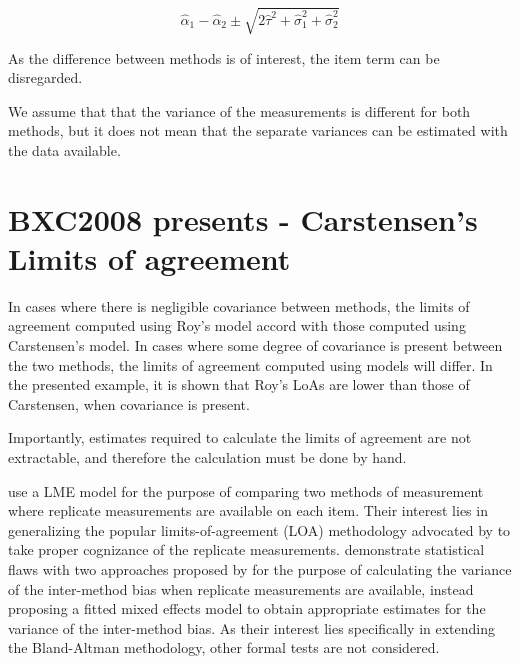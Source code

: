 \documentclass[12pt, a4paper]{report}
\theoremstyle{plain}
\theoremstyle{definition}
\theoremstyle{remark}
\begin{document}
\[
\hat{\alpha}_1 - \hat{\alpha}_2 \pm \sqrt{2 \hat{\tau}^2 +
	\hat{\sigma}^2_1 + \hat{\sigma}^2_2}
\]
\newpage



As the difference between methods is of interest, the item term can be disregarded.

We assume that that the variance of the measurements is different for both methods, but it does not mean that the separate variances can be estimated with the data available.\\








\section{BXC2008 presents - Carstensen's Limits of agreement}


In cases where there is negligible covariance between methods, the limits of agreement computed using Roy's model accord with those computed using Carstensen's model. In cases where some degree of
covariance is present between the two methods, the limits of agreement computed using models will differ. In the presented example, it is shown that Roy's LoAs are lower than those of Carstensen, when covariance is present.

Importantly, estimates required to calculate the limits of agreement are not extractable, and therefore the calculation must be done by hand.

\bigskip
\citet{BXC2008} use a LME model for the purpose of comparing two methods of measurement where replicate measurements are available on each item. Their interest lies in generalizing the popular limits-of-agreement (LOA) methodology advocated by \citet{BA86} to take proper cognizance of the replicate measurements. \citet{BXC2008} demonstrate statistical flaws with two approaches proposed by \citet{BA99} for the purpose of calculating the variance of the inter-method bias when replicate measurements are available, instead proposing a fitted mixed effects model to obtain appropriate estimates for the variance of the inter-method bias.  As their interest lies specifically in extending the Bland-Altman methodology, other formal tests are not considered.
\end{document}

